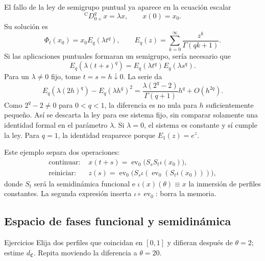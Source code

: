 El fallo de la ley de semigrupo puntual ya aparece en la ecuación escalar
\begin{equation}
 {}^{\mathrm C}D_{0+}^{q}x=\lambda x,\qquad x(0)=x_0.
 \label{eq:geofo-scalar-linear}
\end{equation}
Su solución es
\begin{equation}
 \Phi_t(x_0)=x_0E_q(\lambda t^q),
 \qquad
 E_q(z)=\sum_{k=0}^{\infty}\frac{z^k}{\Gamma(qk+1)}.
 \label{eq:geofo-mittag-solution}
\end{equation}
Si las aplicaciones puntuales formaran un semigrupo, sería necesario que
\begin{equation}
 E_q(\lambda(t+s)^q)
 =E_q(\lambda t^q)E_q(\lambda s^q).
 \label{eq:geofo-false-ml-product}
\end{equation}
Para un \(\lambda\ne0\) fijo, tome \(t=s=h\downarrow0\). La serie da
\[
 E_q\!\left(\lambda(2h)^q\right)-E_q(\lambda h^q)^2
 =\frac{\lambda(2^q-2)}{\Gamma(q+1)}h^q+O(h^{2q}).
\]
Como \(2^q-2\ne0\) para \(0<q<1\), la diferencia es no nula para
\(h\) suficientemente pequeño. Así se descarta la ley para ese sistema
fijo, sin comparar solamente una identidad formal en el parámetro
\(\lambda\). Si \(\lambda=0\), el sistema es constante y sí cumple la ley.
Para \(q=1\), la identidad reaparece porque \(E_1(z)=e^z\).

Este ejemplo separa dos operaciones:
\begin{align}
 \text{continuar: }&x(t+s)=
 \operatorname{ev}_0\bigl(S_sS_t\iota(x_0)\bigr),
 \label{eq:geofo-continue-operation}\\
 \text{reiniciar: }&z(s)=
 \operatorname{ev}_0\bigl(S_s\iota(
 \operatorname{ev}_0(S_t\iota(x_0)))\bigr),
 \label{eq:geofo-reset-operation}
\end{align}
donde \(S_t\) será la semidinámica funcional e
\(\iota(x)(\theta)\equiv x\) la inmersión de perfiles constantes. La segunda
expresión inserta \(\iota\circ\operatorname{ev}_0\): borra la memoria.

\subsection{Espacio de fases funcional y semidinámica}

\ifHAFOPedagogy
\begin{bloqueestudio}{Ejercicios}
Elija dos perfiles que coincidan en \([0,1]\) y difieran después de
\(\theta=2\); estime \(d_{\mathfrak C}\). Repita moviendo la diferencia a
\(\theta=20\).
\end{bloqueestudio}
\fi

